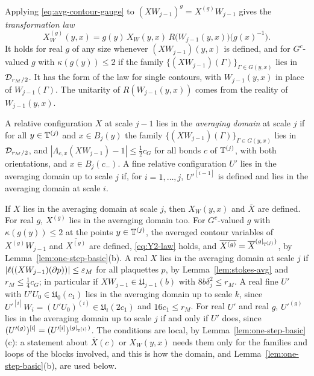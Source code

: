 Applying \eqref{eq:avg-contour-gauge} to $(XW_{j-1})^g=X^{(g)}W_{j-1}$ gives the \emph{transformation law}
\begin{equation}\label{eq:Y2-law}
X^{(g)}_W(y,x)=g(y)\,X_W(y,x)\,R\big(W_{j-1}(y,x)\big)\big(g(x)^{-1}\big).
\end{equation}
It holds for real $g$ of any size whenever $(XW_{j-1})(y,x)$ is defined, and for $G^c$-valued $g$ with $\kappa(g(y))\le2$ if the family $\{(XW_{j-1})(\Gamma)\}_{\Gamma\in G(y,x)}$ lies in $\mathcal D_{r_M/2}$. It has the form of the law for single contours, with $W_{j-1}(y,x)$ in place of $W_{j-1}(\Gamma)$. The unitarity of $R(W_{j-1}(y,x))$ comes from the reality of $W_{j-1}(y,x)$.

\begin{definition}\label{def:avg-domain}
A relative configuration $X$ at scale $j-1$ lies in the \emph{averaging domain} at scale $j$ if for all $y\in\mathbb T^{(j)}$ and $x\in B_j(y)$ the family $\{(XW_{j-1})(\Gamma)\}_{\Gamma\in G(y,x)}$ lies in $\mathcal D_{r_M/2}$, and $|\Lambda_{c,x}(XW_{j-1})-1|\le\frac12c_G$ for all bonds $c$ of $\mathbb T^{(j)}$, with both orientations, and $x\in B_j(c_-)$. A fine relative configuration $U'$ lies in the averaging domain up to scale $j$ if, for $i=1,\dots,j$, $U'^{[i-1]}$ is defined and lies in the averaging domain at scale $i$.
\end{definition}

If $X$ lies in the averaging domain at scale $j$, then $X_W(y,x)$ and $\overline X$ are defined. For real $g$, $X^{(g)}$ lies in the averaging domain too. For $G^c$-valued $g$ with $\kappa(g(y))\le2$ at the points $y\in\mathbb T^{(j)}$, the averaged contour variables of $X^{(g)}W_{j-1}$ and $\overline{X^{(g)}}$ are defined, \eqref{eq:Y2-law} holds, and $\overline{X^{(g)}}=\overline X^{(g|_{\mathbb T^{(j)}})}$, by Lemma~\ref{lem:one-step-basic}(b). A real $X$ lies in the averaging domain at scale $j$ if $|\ell((XW_{j-1})(\partial p))|\le\varepsilon_M$ for all plaquettes $p$, by Lemma~\ref{lem:stokes-avg} and $r_M\le\frac14c_G$; in particular if $XW_{j-1}\in\mathfrak U_{j-1}(b)$ with $8b\delta_j^2\le r_M$. A real fine $U'$ with $U'U_0\in\mathfrak U_0(c_1)$ lies in the averaging domain up to scale $k$, since $U'^{[i]}W_i=(U'U_0)^{(i)}\in\mathfrak U_i(2c_1)$ and $16c_1\le r_M$. For real $U'$ and real $g$, $U'^{(g)}$ lies in the averaging domain up to scale $j$ if and only if $U'$ does, since $(U'^{(g)})^{[i]}=(U'^{[i]})^{(g|_{\mathbb T^{(i)}})}$. The conditions are local, by Lemma~\ref{lem:one-step-basic}(c): a statement about $\overline X(c)$ or $X_W(y,x)$ needs them only for the families and loops of the blocks involved, and this is how the domain, and Lemma~\ref{lem:one-step-basic}(b), are used below.

